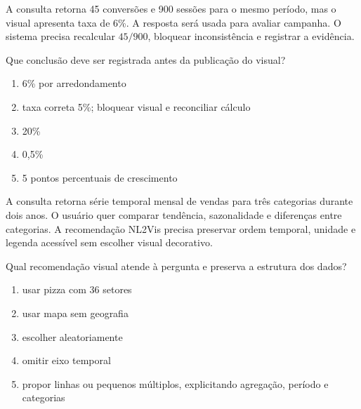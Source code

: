 \TextoBase

A consulta retorna 45 conversões e 900 sessões para o mesmo período, mas o visual apresenta taxa de 6\%. A resposta será usada para avaliar campanha. O sistema precisa recalcular $45/900$, bloquear inconsistência e registrar a evidência.

\FonteDidatica

\Comando Que conclusão deve ser registrada antes da publicação do visual?

\begin{enumerate}[label=\Alph*)]

\item 6\% por arredondamento

\item taxa correta 5\%; bloquear visual e reconciliar cálculo

\item 20\%

\item 0,5\%

\item 5 pontos percentuais de crescimento

\end{enumerate}


\TextoBase

A consulta retorna série temporal mensal de vendas para três categorias durante dois anos. O usuário quer comparar tendência, sazonalidade e diferenças entre categorias. A recomendação NL2Vis precisa preservar ordem temporal, unidade e legenda acessível sem escolher visual decorativo.

\FonteDidatica

\Comando Qual recomendação visual atende à pergunta e preserva a estrutura dos dados?

\begin{enumerate}[label=\Alph*)]

\item usar pizza com 36 setores

\item usar mapa sem geografia

\item escolher aleatoriamente

\item omitir eixo temporal

\item propor linhas ou pequenos múltiplos, explicitando agregação, período e categorias

\end{enumerate}


